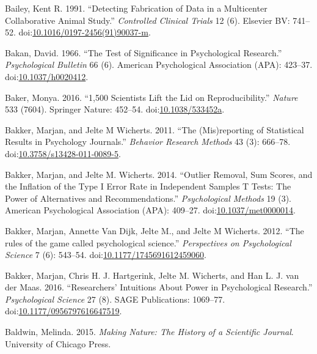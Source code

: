 \documentclass[a5paper]{book}
\begin{document}
\hypertarget{ref-doi:10.1016ux2f0197-24569190037-M}{}
Bailey, Kent R. 1991. ``Detecting Fabrication of Data in a Multicenter
Collaborative Animal Study.'' \emph{Controlled Clinical Trials} 12 (6).
Elsevier BV: 741--52.
doi:\href{https://doi.org/10.1016/0197-2456(91)90037-m}{10.1016/0197-2456(91)90037-m}.

\hypertarget{ref-doi:10.1037ux2fh0020412}{}
Bakan, David. 1966. ``The Test of Significance in Psychological
Research.'' \emph{Psychological Bulletin} 66 (6). American Psychological
Association (APA): 423--37.
doi:\href{https://doi.org/10.1037/h0020412}{10.1037/h0020412}.

\hypertarget{ref-doi:10.1038ux2f533452a}{}
Baker, Monya. 2016. ``1,500 Scientists Lift the Lid on
Reproducibility.'' \emph{Nature} 533 (7604). Springer Nature: 452--54.
doi:\href{https://doi.org/10.1038/533452a}{10.1038/533452a}.

\hypertarget{ref-doi:10.3758ux2fs13428-011-0089-5}{}
Bakker, Marjan, and Jelte M Wicherts. 2011. ``The (Mis)reporting of
Statistical Results in Psychology Journals.'' \emph{Behavior Research
Methods} 43 (3): 666--78.
doi:\href{https://doi.org/10.3758/s13428-011-0089-5}{10.3758/s13428-011-0089-5}.

\hypertarget{ref-doi:10.1037ux2fmet0000014}{}
Bakker, Marjan, and Jelte M. Wicherts. 2014. ``Outlier Removal, Sum
Scores, and the Inflation of the Type I Error Rate in Independent
Samples T Tests: The Power of Alternatives and Recommendations.''
\emph{Psychological Methods} 19 (3). American Psychological Association
(APA): 409--27.
doi:\href{https://doi.org/10.1037/met0000014}{10.1037/met0000014}.

\hypertarget{ref-doi:10.1177ux2f1745691612459060}{}
Bakker, Marjan, Annette Van Dijk, Jelte M., and Jelte M Wicherts. 2012.
``The rules of the game called psychological science.''
\emph{Perspectives on Psychological Science} 7 (6): 543--54.
doi:\href{https://doi.org/10.1177/1745691612459060}{10.1177/1745691612459060}.

\hypertarget{ref-doi:10.1177ux2f0956797616647519}{}
Bakker, Marjan, Chris H. J. Hartgerink, Jelte M. Wicherts, and Han L. J.
van der Maas. 2016. ``Researchers' Intuitions About Power in
Psychological Research.'' \emph{Psychological Science} 27 (8). SAGE
Publications: 1069--77.
doi:\href{https://doi.org/10.1177/0956797616647519}{10.1177/0956797616647519}.

\hypertarget{ref-isbn:9780226261454}{}
Baldwin, Melinda. 2015. \emph{Making Nature: The History of a Scientific
Journal}. University of Chicago Press.
\end{document}
